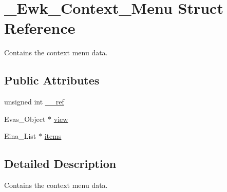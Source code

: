 \hypertarget{struct__Ewk__Context__Menu}{\section{\+\_\+\+Ewk\+\_\+\+Context\+\_\+\+Menu Struct Reference}
\label{struct__Ewk__Context__Menu}
}


Contains the context menu data.  


\subsection*{Public Attributes}
\begin{DoxyCompactItemize}
\item 
unsigned int \hyperlink{struct__Ewk__Context__Menu_a766fe6773baf64c6a7e5b92ff901b371}{\+\_\+\+\_\+ref}
\item 
Evas\+\_\+\+Object $\ast$ \hyperlink{struct__Ewk__Context__Menu_a07207ff4f163f0061a1018bb4b185490}{view}
\item 
Eina\+\_\+\+List $\ast$ \hyperlink{struct__Ewk__Context__Menu_aae4c9fbd5dadc434932e61ba1871f84d}{items}
\end{DoxyCompactItemize}


\subsection{Detailed Description}
Contains the context menu data. 

